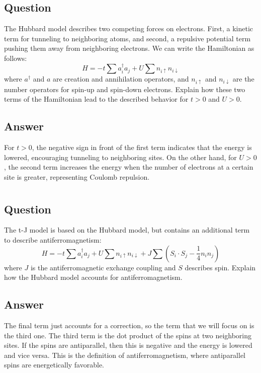 \documentclass[12pt]{article}
\begin{document}
\subsection{Question}
The Hubbard model describes two competing forces on electrons. First, a kinetic term for tunneling to neighboring atoms, and second, a repulsive potential term pushing them away from neighboring electrons. We can write the Hamiltonian as follows:
\begin{equation}
    H=-t \sum a^{\dag}_{i}a_{j} +U \sum n_{i\uparrow}n_{i\downarrow}
\end{equation}
where $a^{\dag}$ and $a$ are creation and annihilation operators, and $n_{i\uparrow}$ and $n_{i\downarrow}$ are the number operators for spin-up and spin-down electrons. Explain how these two terms of the Hamiltonian lead to the described behavior for $t>0$ and $U>0$.
\subsection{Answer}
For $t>0$, the negative sign in front of the first term indicates that the energy is lowered, encouraging tunneling to neighboring sites. On the other hand, for $U>0$, the second term increases the energy when the number of electrons at a certain site is greater, representing Coulomb repulsion.
\section{}
\subsection{Question}
The t-J model is based on the Hubbard model, but contains an additional term to describe antiferromagnetism:
\begin{equation}
    H=-t \sum a^{\dag}_{i}a_{j} +U \sum n_{i\uparrow}n_{i\downarrow} +J \sum (S_{i}\cdot S_{j}-\frac{1}{4}n_{i}n_{j})
\end{equation}
where $J$ is the antiferromagnetic exchange coupling and $S$ describes spin. Explain how the Hubbard model accounts for antiferromagnetism.
\subsection{Answer}
The final term just accounts for a correction, so the term that we will focus on is the third one. The third term is the dot product of the spins at two neighboring sites. If the spins are antiparallel, then this is negative and the energy is lowered and vice versa. This is the definition of antiferromagnetism, where antiparallel spins are energetically favorable.
\end{document}
